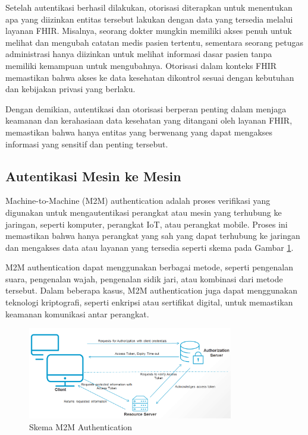 Setelah autentikasi berhasil dilakukan, otorisasi diterapkan untuk menentukan apa yang diizinkan entitas tersebut lakukan dengan data yang tersedia melalui layanan FHIR. Misalnya, seorang dokter mungkin memiliki akses penuh untuk melihat dan mengubah catatan medis pasien tertentu, sementara seorang petugas administrasi hanya diizinkan untuk melihat informasi dasar pasien tanpa memiliki kemampuan untuk mengubahnya. Otorisasi dalam konteks FHIR memastikan bahwa akses ke data kesehatan dikontrol sesuai dengan kebutuhan dan kebijakan privasi yang berlaku.

Dengan demikian, autentikasi dan otorisasi berperan penting dalam menjaga keamanan dan kerahasiaan data kesehatan yang ditangani oleh layanan FHIR, memastikan bahwa hanya entitas yang berwenang yang dapat mengakses informasi yang sensitif dan penting tersebut.

\subsection{Autentikasi Mesin ke Mesin}
Machine-to-Machine (M2M) authentication adalah proses verifikasi yang digunakan untuk mengautentikasi perangkat atau mesin yang terhubung ke jaringan, seperti komputer, perangkat IoT, atau perangkat mobile. Proses ini memastikan bahwa hanya perangkat yang sah yang dapat terhubung ke jaringan dan mengakses data atau layanan yang tersedia seperti skema pada Gambar \ref*{fig:m2m}.

M2M authentication dapat menggunakan berbagai metode, seperti pengenalan suara, pengenalan wajah, pengenalan sidik jari, atau kombinasi dari metode tersebut. Dalam beberapa kasus, M2M authentication juga dapat menggunakan teknologi kriptografi, seperti enkripsi atau sertifikat digital, untuk memastikan keamanan komunikasi antar perangkat.
\begin{figure}
    \centering
    \includegraphics[width=0.8\textwidth]{contents/chapter-3/m2m_auth.png}
    \caption{Skema M2M Authentication}
    \label{fig:m2m}
\end{figure}

